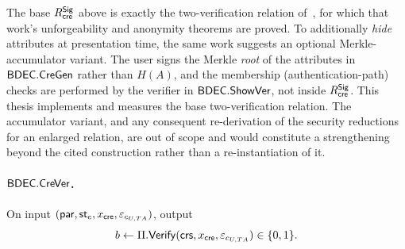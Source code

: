 \begin{construction}
\begin{remark}\label{rem:merkle-extension}
The base $R_{\mathsf{cre}}^{\mathsf{Sig}}$ above is exactly the two-verification relation of~\cite{10.1007/978-981-96-0957-4_3}, for which that work's unforgeability and anonymity theorems are proved. To additionally \emph{hide} attributes at presentation time, the same work suggests an optional Merkle-accumulator variant. The user signs the Merkle \emph{root} of the attributes in $\mathsf{BDEC}.\mathsf{CreGen}$ rather than $H(A)$, and the membership (authentication-path) checks are performed by the verifier in $\mathsf{BDEC}.\mathsf{ShowVer}$, not inside $R_{\mathsf{cre}}^{\mathsf{Sig}}$. This thesis implements and measures the base two-verification relation. The accumulator variant, and any consequent re-derivation of the security reductions for an enlarged relation, are out of scope and would constitute a strengthening beyond the cited construction rather than a re-instantiation of it.
\end{remark}

\paragraph{$\mathsf{BDEC}.\mathsf{CreVer}$.}
On input $(\mathsf{par},\mathsf{st}_e,x_{\mathsf{cre}},\varepsilon_{c_{U,TA}})$, output
\begin{equation*}
  b\leftarrow\Pi.\mathsf{Verify}(\mathsf{crs},x_{\mathsf{cre}},\varepsilon_{c_{U,TA}})\in\{0,1\}.
\end{equation*}


\end{construction}
